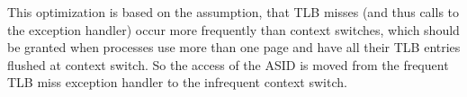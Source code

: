 This optimization is based on the assumption, that TLB misses (and thus calls to the exception handler) occur more frequently than context switches, which should be granted when processes use more than one page and have all their TLB entries flushed at context switch.
So the access of the ASID is moved from the frequent TLB miss exception handler to the infrequent context switch. %






